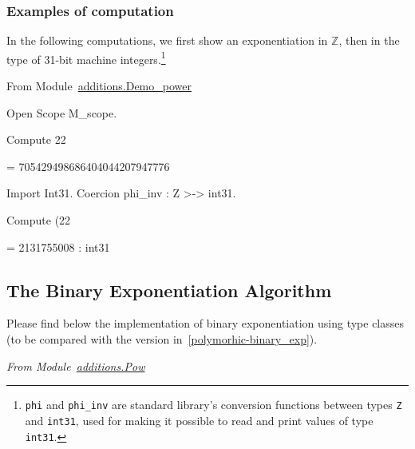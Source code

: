 \subsubsection{Examples of computation}

In the following computations, we first show an exponentiation in $\mathds{Z}$, then in
the type of 31-bit machine integers.\footnote{\texttt{phi} and \texttt{phi\_inv} are 
standard library's conversion
functions between types \texttt{Z} and \texttt{int31}, used for making it possible to read  and print values of type \texttt{int31}.}

\vspace{4pt}

From Module~\href{../theories/html/hydras.additions.Demo_power.html}{additions.Demo\_power}



\begin{Coqsrc}
Open Scope M_scope.

Compute 22%
\end{Coqsrc}

\begin{Coqanswer}
= 705429498686404044207947776%
\end{Coqanswer}

\begin{Coqsrc}
Import Int31.
Coercion phi_inv : Z >-> int31.

Compute (22%
\end{Coqsrc}

\begin{Coqanswer}
   = 2131755008%
     : int31
\end{Coqanswer}

\subsection{The Binary Exponentiation Algorithm}

Please find below the implementation of binary exponentiation using type classes
(to be compared with the version in~\vref{polymorhic-binary_exp}).



\vspace{4pt}
\emph{From Module~\href{../theories/html/hydras.additions.Pow.html}{additions.Pow}}

